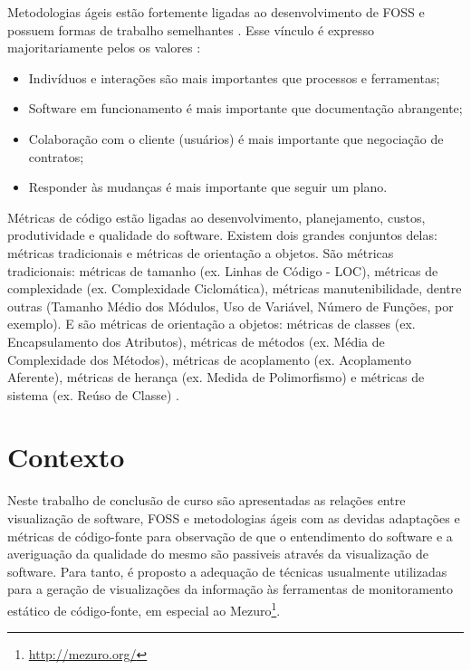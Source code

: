 Metodologias ágeis estão fortemente ligadas ao desenvolvimento de FOSS e
possuem formas de trabalho semelhantes \cite{meirelles2013monitoramento}. Esse
vínculo é expresso majoritariamente pelos os valores \cite{beck2001manifesto}:

\begin{itemize}
  \item Indivíduos e interações são mais importantes que processos e
  ferramentas;
  \item Software em funcionamento é mais importante que documentação abrangente;
  \item Colaboração com o cliente (usuários) é mais importante que negociação
  de contratos;
  \item Responder às mudanças é mais importante que seguir um plano.
\end{itemize}

Métricas de código estão ligadas ao desenvolvimento, planejamento, custos,
produtividade e qualidade do software. Existem dois grandes conjuntos delas:
métricas tradicionais e métricas de orientação a objetos. São métricas
tradicionais: métricas de tamanho (ex. Linhas de Código - LOC), métricas de
complexidade (ex. Complexidade Ciclomática), métricas manutenibilidade, dentre
outras (Tamanho Médio dos Módulos, Uso de Variável, Número de Funções, por
exemplo). E são métricas de orientação a objetos: métricas de classes (ex.
Encapsulamento dos Atributos), métricas de métodos (ex. Média de Complexidade
dos Métodos), métricas de acoplamento (ex. Acoplamento Aferente), métricas de
herança (ex. Medida de Polimorfismo) e métricas de sistema (ex. Reúso de
Classe) \cite{meirelles2013monitoramento}.


\section{Contexto}

Neste trabalho de conclusão de curso são apresentadas as relações entre
visualização de software, FOSS e metodologias ágeis com as devidas adaptações e
métricas de código-fonte para observação de que o entendimento do software e a
averiguação da qualidade do mesmo são passiveis através da visualização de
software. Para tanto, é proposto a adequação de técnicas usualmente utilizadas
para a geração de visualizações da informação às ferramentas de monitoramento
estático de código-fonte, em especial ao
Mezuro\footnote{\url{http://mezuro.org/}}.

